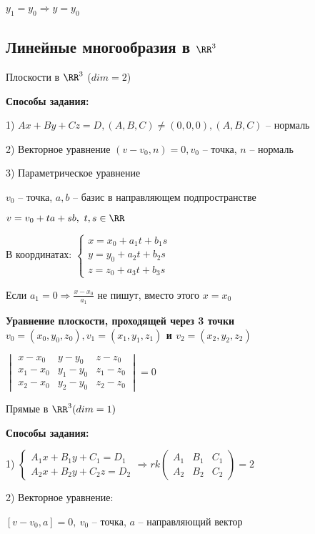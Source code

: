 $y_1 = y_0 \Rightarrow y = y_0$

\subsection{Линейные многообразия в $\RR^3$}

Плоскости в $\RR^3$ ($dim = 2$)

\textbf{Способы задания:}

1) $Ax + By + Cz = D, (A, B, C) \neq (0, 0, 0), (A, B, C)$ -- нормаль

2) Векторное уравнение $(v - v_0, n) = 0, v_0$ -- точка, $n$ -- нормаль

3) Параметрическое уравнение

$v_0$ -- точка, $a, b$ -- базис в направляющем подпространстве

$v = v_0 + ta + sb, \ t, s \in \RR$

В координатах: $\begin{cases} x = x_0 + a_1 t + b_1 s \\ y = y_0 + a_2 t + b_2 s \\ z = z_0 + a_3 t + b_3 s \end{cases}$

Если $a_1 = 0 \Rightarrow \frac{x - x_0}{a_1}$ не пишут, вместо этого $x = x_0$

\bigskip
\textbf{Уравнение плоскости, проходящей через 3 точки $v_0 = (x_0, y_0, z_0), v_1 = (x_1, y_1, z_1)$ и $v_2 = (x_2, y_2, z_2)$}

$\begin{vmatrix} x - x_0 & y - y_0 & z - z_0 \\ x_1 - x_0 & y_1 - y_0 & z_1 - z_0 \\ x_2 - x_0 & y_2 - y_0 & z_2 - z_0 \end{vmatrix} = 0$

\bigskip
Прямые в $\RR^3 (dim = 1)$

\textbf{Способы задания:}

1) $\begin{cases} A_1 x + B_1 y + C_1 = D_1 \\ A_2 x + B_2 y + C_2 z = D_2 \end{cases} \Rightarrow rk \begin{pmatrix} A_1 & B_1 & C_1 \\ A_2 & B_2 & C_2 \end{pmatrix} = 2$

2) Векторное уравнение:

$[v - v_0, a] = 0, \ v_0$ -- точка, $a$ -- направляющий вектор

